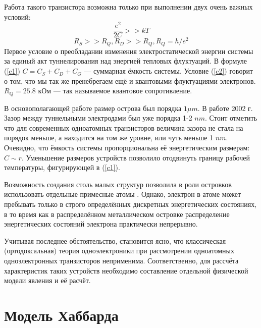 \documentclass[12pt,a4paper]{report}
\begin{document}
Работа такого транзистора возможна только при выполнении двух очень важных условий:
\begin{equation}\label{c1}
\frac{e^2}{2C} >> kT
\end{equation}
\begin{equation}\label{c2}
R_S >> R_Q, R_D >> R_Q,  R_Q = h/e^2
\end{equation}
Первое условие о преобладании изменения электростатической энергии системы за единый акт туннелирования над энергией тепловых флуктуаций. В формуле (\ref{c1}) $C = C_S + C_D + C_G$ — суммарная ёмкость системы. Условие (\ref{c2}) говорит о том, что мы так же пренебрегаем ещё и квантовыми флуктуациями электронов. $R_Q = 25.8$ кОм — так называемое квантовое сопротивление.

В основополагающей работе \cite{Fulton_Dolan} размер острова был порядка $1\mu m$. В работе 2002 г. \cite{SASET1} Зазор между туннельными электродами был уже порядка 1-2 $nm$. Стоит отметить что для современных одноатомных транзисторов величина зазора не стала на порядок меньше, а находится на том же уровне, или чуть меньше 1 $nm$. Очевидно, что ёмкость системы пропорциональна её энергетическим размерам: $C \sim r$. Уменьшение размеров устройств позволило отодвинуть границу рабочей температуры, фигурирующей в (\ref{c1}).

Возможность создания столь малых структур позволила в роли островков использовать отдельные примесные атомы \cite{SASET_EXP_OUR, SMSET}. Однако, электрон в атоме может пребывать только в строго определённых дискретных энергетических состояниях, в то время как в распределённом металлическом островке распределение энергетических состояний электрона практически непрерывно.

Учитывая последнее обстоятельство, становится ясно, что классическая (ортодоксальная)\cite{Likharev} теория одноэлектроники при рассмотрении одноатомных одноэлектронных транзисторов  неприменима. Соответственно, для рассчёта характеристик таких устройств необходимо составление отдельной физической модели явления и её расчёт.
\section{Модель Хаббарда}
\end{document}
